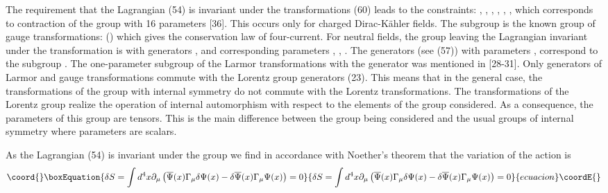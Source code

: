 \documentclass[a4paper,12pt]{article}
\begin{document}
The requirement that the Lagrangian (54) is invariant under the
transformations (60) leads to the constraints: \myHighlight{$\alpha
^{*}=-\alpha $}\coordHE{}, \coordHE{}, \coordHE{}, \coordHE{}, \coordHE{}, \coordHE{}  \coordHE{},
\myHighlight{$\xi ^{*}=\xi $}\coordHE{} which corresponds to contraction of the \coordHE{} group with 16 parameters [36]. This occurs
only for charged Dirac-K\"ahler fields. The subgroup \coordHE{} is the
known group of gauge transformations: \coordHE{} (\myHighlight{$\alpha ^{*}=-\alpha $}\coordHE{}) which
gives the conservation law of four-current. For neutral fields,
the group leaving the Lagrangian invariant under the
transformation is \coordHE{} with generators \coordHE{},
\coordHE{} and corresponding parameters \coordHE{}, \coordHE{},
\coordHE{}  \coordHE{}. The
generators \coordHE{} (see (57)) with parameters \coordHE{}, \coordHE{}
correspond to the subgroup \coordHE{}. The one-parameter subgroup
of the Larmor transformations with the generator \coordHE{}
was mentioned in [28-31]. Only generators of Larmor and gauge
transformations commute with the Lorentz group generators (23).
This means that in the general case, the transformations of the
group with internal symmetry \coordHE{} do not commute with the
Lorentz transformations. The transformations of the Lorentz group
realize the operation of internal automorphism with respect to the
elements of the group considered. As a consequence, the parameters
of this group are tensors. This is the main difference between the
group being considered and the usual groups of internal symmetry
where parameters are scalars.

As the Lagrangian (54) is invariant under the \coordHE{} group we
find in accordance with Noether's theorem that the variation of the action
is
\begin{equation}\coord{}\boxEquation{
\delta S=\int d^4x\partial _\mu \left( \overline{\Psi }(x)\Gamma _\mu \delta
\Psi (x)-\delta \overline{\Psi }(x)\Gamma _\mu \Psi (x)\right) =0  \label{61}
}{
\delta S=\int d^4x\partial _\mu \left( \overline{\Psi }(x)\Gamma _\mu \delta
\Psi (x)-\delta \overline{\Psi }(x)\Gamma _\mu \Psi (x)\right) =0  }{ecuacion}\coordE{}\end{equation}
\end{document}
